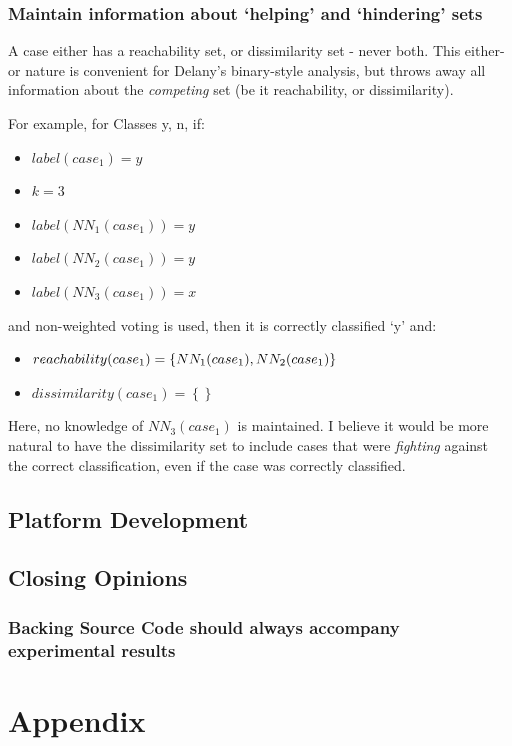 \documentclass[a4paper,11pt]{report}
\begin{document}
\subsection{Maintain information about `helping' and `hindering' sets}
A case either has a reachability set, or dissimilarity set - never both. This either-or nature is convenient for Delany's binary-style analysis, but throws away all information about the \emph{competing} set (be it reachability, or dissimilarity).

For example, for Classes {y, n}, if:
\begin{itemize}
	\item $label(case_{1})=y$ 
	\item $k = 3$
	\item $label(NN_{1}(case_{1})) = y$ 
	\item $label(NN_{2}(case_{1})) = y$
	\item $label(NN_{3}(case_{1})) = x$  
\end{itemize}
and non-weighted voting is used, then it is correctly classified `y' and:
\begin{itemize}
	\item $reachability(case_{1})=\left\{ NN_{1}(case_{1}),\hphantom{}NN_{2}(case_{1})\right\} $
	\item $dissimilarity(case_{1})=\left\{ \right\} $
\end{itemize}

Here, no knowledge of $NN_{3}(case_{1})$ is maintained. I believe it would be more natural to have the dissimilarity set to include cases that were \emph{fighting} against the correct classification, even if the case was correctly classified.

\section{Platform Development}

\section{Closing Opinions}
\subsection{Backing Source Code should always accompany experimental results}


\chapter{Appendix}
\end{document}
